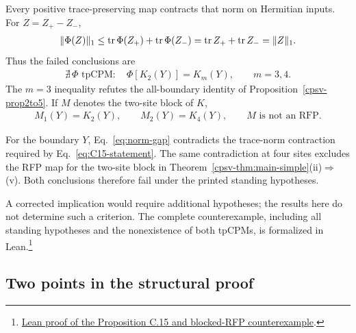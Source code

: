 \documentclass[aps,pra,reprint,nofootinbib,onecolumn]{revtex4-2}
\begin{document}
Every positive trace-preserving map contracts that norm on
Hermitian inputs. For $Z=Z_+-Z_-$,
\begin{align}
	\|\Phi(Z)\|_1
	\leq\operatorname{tr}\Phi(Z_+)+\operatorname{tr}\Phi(Z_-)
	=\operatorname{tr} Z_++\operatorname{tr} Z_-=\|Z\|_1.
	\label{eq:contraction-prop}
\end{align}
Thus the failed conclusions are
\begin{align}
	\nexists\,\Phi\text{ tpCPM}:\quad
	\Phi[K_2(Y)]=K_m(Y),
	\qquad m=3,4.
	\label{eq:no-channel-m34}
\end{align}
The $m=3$ inequality refutes the all-boundary identity of
Proposition~\ref{cpsv-prop2to5}. If $M$ denotes the two-site block of $K$,
\begin{align}
	M_1(Y)=K_2(Y),\qquad M_2(Y)=K_4(Y),
	\qquad M\text{ is not an RFP}.
	\label{eq:M-block-id}
\end{align}
\begin{refutation}
	For the boundary $Y$, Eq.~\eqref{eq:norm-gap} contradicts the
	trace-norm contraction required by Eq.~\eqref{eq:C15-statement}.
	The same contradiction at four sites excludes the RFP map for the two-site
	block in Theorem~\ref{cpsv-thm:main-simple}(ii)$\Rightarrow$(v).
	Both conclusions therefore fail under the printed standing hypotheses.
\end{refutation}
A corrected implication would require additional hypotheses; the results
here do not determine such a criterion.
The complete counterexample, including all standing hypotheses and the
nonexistence of both tpCPMs, is formalized in Lean.\footnote{\href{https://github.com/LionSR/TNLean/blob/f45bfbbccf671395e4f6018845f81b8aaaad4cb1/TNLean/MPS/MPDO/CPSVBlockingChannelAmbientCounterexample.lean\#L124}{Lean proof of the Proposition C.15 and blocked-RFP counterexample}.}

\subsection{Two points in the structural proof}
\end{document}
